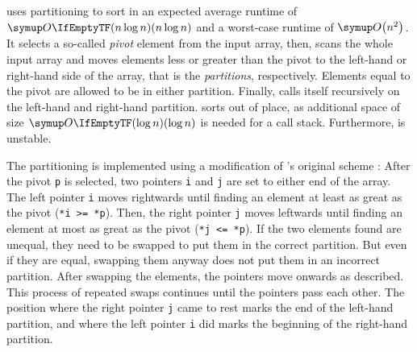 \section{\texorpdfstring{\QS{}}{QuickSort}}
\label{sec:tasklet:quick}

\QS{} \cites{hoare1962quicksort}[88-91]{maurer1974datenstrukturen}[Section~2.2.6]{wirth1975algorithmen} uses partitioning to sort in an expected average runtime of \(\bigoh{n \log n}\) and a worst-case runtime of \(\bigoh*{n^2}\).
It selects a so-called \emph{pivot} element from the input array, then, scans the whole input array and moves elements less or greater than the pivot to the left-hand or right-hand side of the array, that is the \emph{partitions}, respectively.
Elements equal to the pivot are allowed to be in either partition.
Finally, \QS{} calls itself recursively on the left-hand and right-hand partition.
\QS{} sorts out of place, as additional space of size \(\bigoh{\log n}\) is needed for a call stack.
Furthermore, \QS{} is unstable.

The partitioning is implemented using a modification of \citeauthor{hoare1962quicksort}'s original scheme \cite{hoare1962quicksort}:
After the pivot \lstinline|p| is selected, two pointers \lstinline|i| and \lstinline|j| are set to either end of the array.
The left pointer \lstinline|i| moves rightwards until finding an element at least as great as the pivot (\lstinline|*i >= *p|).
Then, the right pointer \lstinline|j| moves leftwards until finding an element at most as great as the pivot (\lstinline|*j <= *p|).
If the two elements found are unequal, they need to be swapped to put them in the correct partition.
But even if they are equal, swapping them anyway does not put them in an incorrect partition.
After swapping the elements, the pointers move onwards as described.
This process of repeated swaps continues until the pointers pass each other.
The position where the right pointer \lstinline|j| came to rest marks the end of the left-hand partition, and where the left pointer \lstinline|i| did marks the beginning of the right-hand partition.






